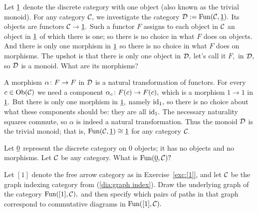 \documentclass[CT4S-EN-RU]{subfiles}
\begin{document}
\begin{exampleENG}
Let $\underline{1}$ denote the discrete category with one object (also known as the trivial monoid). For any category $\mathcal{C},$ we investigate the category $\mathcal{D}:=\textnormal{Fun}(\mathcal{C},\underline{1}).$ Its objects are functors $\mathcal{C}\rightarrow\underline{1}.$ Such a functor $F$ assigns to each object in $\mathcal{C}$ an object in $\underline{1}$ of which there is one; so there is no choice in what $F$ does on objects. And there is only one morphism in $\underline{1}$ so there is no choice in what $F$ does on morphisms. The upshot is that there is only one object in $\mathcal{D},$ let's call it $F,$ in $\mathcal{D},$ so $\mathcal{D}$ is a monoid. What are its morphisms? 

A morphism $\alpha\colon F\rightarrow F$ in $\mathcal{D}$ is a natural transformation of functors. For every $c\in\textnormal{Ob}(\mathcal{C})$ we need a component $\alpha_c\colon F(c)\rightarrow F(c),$ which is a morphism $1\to 1$ in $\underline{1}.$ But there is only one morphism in $\underline{1},$ namely $\textnormal{id}_1,$ so there is no choice about what these components should be: they are all $\textnormal{id}_1.$ The necessary naturality squares commute, so $\alpha$ is indeed a natural transformation. Thus the monoid $\mathcal{D}$ is the trivial monoid; that is, $\textnormal{Fun}(\mathcal{C},\underline{1})\cong\underline{1}$ for any category $\mathcal{C}.$
\end{exampleENG}

\begin{exampleRUS}
\end{exampleRUS}

\begin{exerciseENG}
Let $\underline{0}$ represent the discrete category on 0 objects; it has no objects and no morphisms. Let $\mathcal{C}$ be any category. What is $\textnormal{Fun}(\underline{0},\mathcal{C})?$
\end{exerciseENG}

\begin{exerciseRUS}
\end{exerciseRUS}

\begin{exerciseENG}
Let $[1]$ denote the free arrow category as in Exercise~\ref{exc:[1]}, and let $\mathcal{C}$ be the graph indexing category from (\ref{dia:graph index}). Draw the underlying graph of the category $\textnormal{Fun}([1],\mathcal{C}),$ and then specify which pairs of paths in that graph correspond to commutative diagrams in $\textnormal{Fun}([1],\mathcal{C}).$
\end{exerciseENG}

\begin{exerciseRUS}
\end{exerciseRUS}

\end{document}
